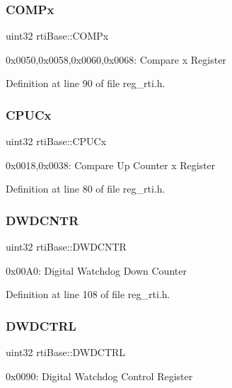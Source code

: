 \subsubsection{\texorpdfstring{C\+O\+M\+Px}{COMPx}}
{\footnotesize\ttfamily uint32 rti\+Base\+::\+C\+O\+M\+Px}

0x0050,0x0058,0x0060,0x0068\+: Compare x Register 

Definition at line 90 of file reg\+\_\+rti.\+h.

\mbox{\label{structrtiBase_aba086ca9db9f36df6db78fecc4fc6d13}} 
\subsubsection{\texorpdfstring{C\+P\+U\+Cx}{CPUCx}}
{\footnotesize\ttfamily uint32 rti\+Base\+::\+C\+P\+U\+Cx}

0x0018,0x0038\+: Compare Up Counter x Register 

Definition at line 80 of file reg\+\_\+rti.\+h.

\mbox{\label{structrtiBase_a58e540ffd83ecc9b8106e8c3590382fd}} 
\subsubsection{\texorpdfstring{D\+W\+D\+C\+N\+TR}{DWDCNTR}}
{\footnotesize\ttfamily uint32 rti\+Base\+::\+D\+W\+D\+C\+N\+TR}

0x00\+A0\+: Digital Watchdog Down Counter 

Definition at line 108 of file reg\+\_\+rti.\+h.

\mbox{\label{structrtiBase_addf5819e930e3855140019f5c0a67bca}} 
\subsubsection{\texorpdfstring{D\+W\+D\+C\+T\+RL}{DWDCTRL}}
{\footnotesize\ttfamily uint32 rti\+Base\+::\+D\+W\+D\+C\+T\+RL}

0x0090\+: Digital Watchdog Control Register 

